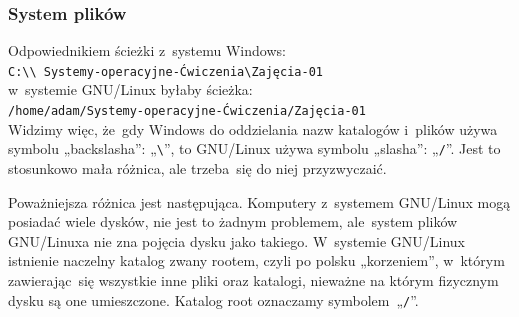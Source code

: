 \documentclass[10pt,t]{beamer}
\begin{document}
\begin{frame}
  \frametitle{System plików}


  Odpowiednikiem ścieżki z~systemu Windows: \\
  \texttt{C:\textbackslash\textbackslash
    Systemy-operacyjne-Ćwiczenia\textbackslash Zajęcia-01} \\
  w~systemie GNU/Linux byłaby ścieżka: \\
  \texttt{/home/adam/Systemy-operacyjne-Ćwiczenia/Zajęcia-01} \\
  Widzimy więc, że~gdy Windows do oddzielania nazw katalogów i~plików
  używa symbolu „backslasha”: „\texttt{\textbackslash}”, to GNU/Linux
  używa symbolu „slasha”: „\texttt{/}”. Jest to stosunkowo mała różnica,
  ale trzeba~się do niej przyzwyczaić.

  Poważniejsza różnica jest następująca. Komputery z~systemem GNU/Linux
  mogą posiadać wiele dysków, nie jest to żadnym problemem, ale~system
  plików GNU/Linuxa nie zna pojęcia dysku jako takiego. W~systemie GNU/Linux
  istnienie naczelny katalog zwany rootem, czyli po polsku „korzeniem”,
  w~którym zawierając~się wszystkie inne pliki oraz katalogi, nieważne na
  którym fizycznym dysku są one umieszczone. Katalog root oznaczamy
  symbolem~„\texttt{/}”.

\end{frame}








\end{document}
